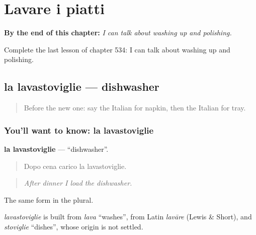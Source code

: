 
\chapter{Lavare i piatti}
\label{ch:it-lavare-i-piatti}

\begin{chapteropening}
\textbf{By the end of this chapter:} \emph{I can talk about washing up and polishing.}

Complete the last lesson of chapter 534: I can talk about washing up and polishing.
\end{chapteropening}

\section[la lavastoviglie]{la lavastoviglie — dishwasher}

\label{lesson:IT-C534-lavastoviglie}



\begin{quote}
Before the new one: say the Italian for napkin, then the Italian for tray.
\end{quote}

\subsection*{You'll want to know: la lavastoviglie}
\textbf{la lavastoviglie} — \textquotedblleft{}dishwasher\textquotedblright{}.

\begin{quote}
Dopo cena carico la lavastoviglie.
\end{quote}

\begin{quote}
\emph{After dinner I load the dishwasher.}
\end{quote}

The same form in the plural.

\begin{cousinweb}
\emph{lavastoviglie} is built from \emph{lava} \textquotedblleft{}washes\textquotedblright{}, from Latin \emph{lavāre} (Lewis \& Short), and \emph{stoviglie} \textquotedblleft{}dishes\textquotedblright{}, whose origin is not settled.
\end{cousinweb}

